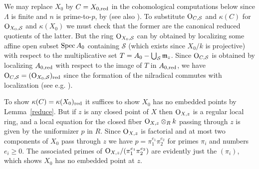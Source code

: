 \documentclass{amsart}
\theoremstyle{plain}
\theoremstyle{definition}
\theoremstyle{remark}
\numberwithin{equation}{section}%
\renewcommand{\O}{{\text{\rm O}}}
\renewcommand{\S}{{\mathcal S}}
\newcommand{\red}{{\text{\rm red}}}
\newcommand{\Spec}{{\text{\rm Spec}\,}}
\begin{document}
We may replace $X_0$ by $C=X_{0,\red}$ in the cohomological computations below
since $\Lambda$ is finite and $n$ is prime-to-$p$,
by \cite[V.2.4(c)]{M} (see also \cite[II.3.11]{M}).  To substitute $\O_{C,\S}$
and $\kappa(C)$ for $\O_{X_0,\S}$ and $\kappa(X_0)$ we must check that the former
are the canonical reduced quotients of the latter.
But the ring $\O_{X_0,\S}$ can by obtained by localizing some affine open subset $\Spec A_0$
containing $\S$ (which exists since $X_0/k$ is projective)
with respect to the multiplicative set $T=A_0-\bigcup_\S\frak m_z$.
Since $\O_{C,\S}$ is obtained by localizing $A_{0,\red}$ with respect to the image of $T$ in $A_{0,\red}$,
we have $\O_{C,\S}=(\O_{X_0,\S})_\red$ since the formation of the nilradical commutes
with localization (see e.g. \cite[3.12]{AM}).

To show $\kappa(C)=\kappa(X_0)_\red$ it suffices to show $X_0$ has no embedded points
by Lemma~\ref{reduce}.
But if $z$ is any closed point of $X$ then $\O_{X,z}$ is a regular local ring,
and a local equation for the closed fiber $\O_{X,z}\otimes_R k$ passing through $z$ is given by
the uniformizer $p$ in $R$.  Since $\O_{X,z}$
is factorial and at most two components of $X_0$ pass through $z$ we have
$p=\pi_1^{e_1}\pi_2^{e_2}$ for primes $\pi_i$ and numbers $e_i\geq 0$.
The associated primes of $\O_{X,z}/(\pi_1^{e_1}\pi_2^{e_2})$ are evidently just
the $(\pi_i)$, which shows $X_0$ has no embedded point at $z$.
\end{document}
